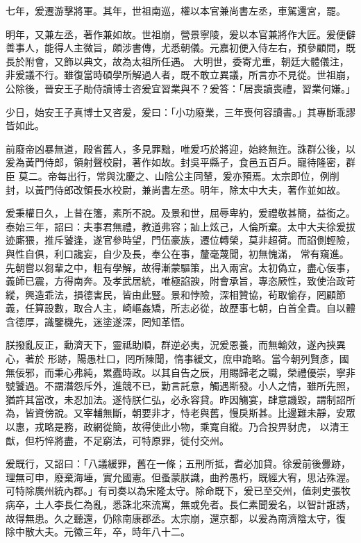 \begin{pinyinscope}
 七年，爰遷游擊將軍。其年，世祖南巡，權以本官兼尚書左丞，車駕還宮，罷。



 明年，又兼左丞，著作兼如故。世祖崩，營景寧陵，爰以本官兼將作大匠。爰便僻善事人，能得人主微旨，頗涉書傳，尤悉朝儀。元嘉初便入侍左右，預參顧問，既長於附會，又飾以典文，故為太祖所任遇。
 大明世，委寄尤重，朝廷大體儀注，非爰議不行。雖復當時碩學所解過人者，既不敢立異議，所言亦不見從。世祖崩，公除後，晉安王子勛侍讀博士咨爰宜習業與不？爰答：「居喪讀喪禮，習業何嫌。」



 少日，始安王子真博士又咨爰，爰曰：「小功廢業，三年喪何容讀書。」其專斷乖謬皆如此。



 前廢帝凶暴無道，殿省舊人，多見罪黜，唯爰巧於將迎，始終無迕。誅群公後，以爰為黃門侍郎，領射聲校尉，著作如故。封吳平縣子，食邑五百戶。寵待隆密，群臣
 莫二。帝每出行，常與沈慶之、山陰公主同輦，爰亦預焉。太宗即位，例削封，以黃門侍郎改領長水校尉，兼尚書左丞。明年，除太中大夫，著作並如故。



 爰秉權日久，上昔在籓，素所不說。及景和世，屈辱卑約，爰禮敬甚簡，益銜之。泰始三年，詔曰：夫事君無禮，教道弗容；訕上炫己，人倫所棄。太中大夫徐爰拔迹廝猥，推斥饕逢，遂官參時望，門伍豪族，遷位轉榮，莫非超荷。而諂側輕險，與性自俱，利口讒妄，自少及長，奉公在事，釐毫蔑聞，初無愧滿，
 常有窺進。先朝嘗以芻輩之中，粗有學解，故得漸蒙驅策，出入兩宮。太初偽立，盡心佞事，義師已震，方得南奔。及孝武居統，唯極諂諛，附會承旨，專恣厥性，致使治政苛縱，興造乖法，損德害民，皆由此豎。景和悖險，深相贊協，茍取偷存，罔顧節義，任算設數，取合人主，崎嶇姦矯，所志必從，故歷事七朝，白首全貴。自以體含德厚，識鑒機先，迷塗遂深，罔知革悟。



 朕撥亂反正，勳濟天下，靈祗助順，群逆必夷，況爰恩養，而無輸效，遂內挾異心，著於
 形跡，陽愚杜口，罔所陳聞，惰事緩文，庶申詭略。當今朝列賢彥，國無佞邪，而秉心弗純，累蠹時政。以其自告之辰，用賜歸老之職，榮禮優崇，寧非號饕過。不謂潛怨斥外，進競不已，勤言託意，觸遇斯發。小人之情，雖所先照，猶許其當改，未忍加法。遂恃朕仁弘，必永容貸。昨因觴宴，肆意譏毀，謂制詔所為，皆資傍說。又宰輔無斷，朝要非才，恃老與舊，慢戾斯甚。比邊難未靜，安眾以惠，戎略是務，政網從簡，故得使此小物，乘寬自縱。乃合投畀豺虎，
 以清王猷，但朽悴將盡，不足窮法，可特原罪，徙付交州。



 爰既行，又詔曰：「八議緩罪，舊在一條；五刑所抵，耆必加貸。徐爰前後釁跡，理無可申，廢棄海埵，實允國憲。但蚤蒙朕識，曲矜愚朽，既經大宥，思沾殊渥。可特除廣州統內郡。」有司奏以為宋隆太守。除命既下，爰已至交州，值刺史張牧病卒，土人李長仁為亂，悉誅北來流寓，無或免者。長仁素聞爰名，以智計誑誘，故得無患。久之聽還，仍除南康郡丞。太宗崩，還京都，以爰為南濟陰太守，復
 除中散大夫。元徽三年，卒，時年八十二。




\end{pinyinscope}
